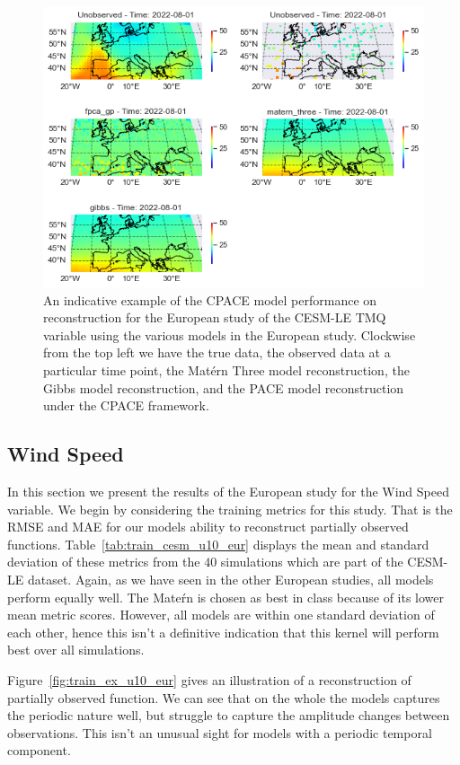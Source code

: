 \begin{figure}
	\centering
	\includegraphics[width=\textwidth]{full_ex_tmq_eur}
	\caption{An indicative example of the CPACE model performance on reconstruction for the European study of the CESM-LE TMQ variable using the various models in the European study. Clockwise from the top left we have the true data, the observed data at a particular time point, the Mat\'ern Three model reconstruction, the Gibbs model reconstruction, and the PACE model reconstruction under the CPACE framework.}
	\label{fig:full_ex_tmq_eur}
\end{figure}

\subsection{Wind Speed \label{ssec:cesm_u10_eur}}
In this section we present the results of the European study for the Wind Speed variable. 
We begin by considering the training metrics for this study.
That is the RMSE and MAE for our models ability to reconstruct partially observed functions.
Table~\ref{tab:train_cesm_u10_eur} displays the mean and standard deviation of these metrics from the $40$ simulations which are part of the CESM-LE dataset. 
Again, as we have seen in the other European studies, all models perform equally well.
The Mate\'rn is chosen as best in class because of its lower mean metric scores.
However, all models are within one standard deviation of each other, hence this isn't a definitive indication that this kernel will perform best over all simulations.

Figure~\ref{fig:train_ex_u10_eur} gives an illustration of a reconstruction of partially observed function.
We can see that on the whole the models captures the periodic nature well, but struggle to capture the amplitude changes between observations.
This isn't an unusual sight for models with a periodic temporal component.
 
